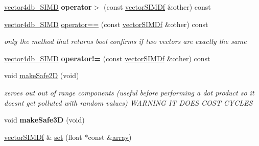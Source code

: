 \begin{DoxyCompactItemize}
\item 
\hyperlink{classirr_1_1core_1_1vectorSIMDBool}{vector4db\+\_\+\+S\+I\+MD} {\bfseries operator$>$} (const \hyperlink{classirr_1_1core_1_1vectorSIMDf}{vector\+S\+I\+M\+Df} \&other) const \hypertarget{classirr_1_1core_1_1vectorSIMDf_a0a0b64421af4b0719b59ccef81ecd781}{}\label{classirr_1_1core_1_1vectorSIMDf_a0a0b64421af4b0719b59ccef81ecd781}

\item 
\hyperlink{classirr_1_1core_1_1vectorSIMDBool}{vector4db\+\_\+\+S\+I\+MD} \hyperlink{classirr_1_1core_1_1vectorSIMDf_ac9fb94dca9de195b0670b045cd8df896}{operator==} (const \hyperlink{classirr_1_1core_1_1vectorSIMDf}{vector\+S\+I\+M\+Df} \&other) const \hypertarget{classirr_1_1core_1_1vectorSIMDf_ac9fb94dca9de195b0670b045cd8df896}{}\label{classirr_1_1core_1_1vectorSIMDf_ac9fb94dca9de195b0670b045cd8df896}

\begin{DoxyCompactList}\small\item\em only the method that returns bool confirms if two vectors are exactly the same \end{DoxyCompactList}\item 
\hyperlink{classirr_1_1core_1_1vectorSIMDBool}{vector4db\+\_\+\+S\+I\+MD} {\bfseries operator!=} (const \hyperlink{classirr_1_1core_1_1vectorSIMDf}{vector\+S\+I\+M\+Df} \&other) const \hypertarget{classirr_1_1core_1_1vectorSIMDf_ab0a9a26c761dc292172803693b3fedb8}{}\label{classirr_1_1core_1_1vectorSIMDf_ab0a9a26c761dc292172803693b3fedb8}

\item 
void \hyperlink{classirr_1_1core_1_1vectorSIMDf_a49f886d7f73c7878c120d09eae9a9366}{make\+Safe2D} (void)\hypertarget{classirr_1_1core_1_1vectorSIMDf_a49f886d7f73c7878c120d09eae9a9366}{}\label{classirr_1_1core_1_1vectorSIMDf_a49f886d7f73c7878c120d09eae9a9366}

\begin{DoxyCompactList}\small\item\em zeroes out out of range components (useful before performing a dot product so it doesnt get polluted with random values) W\+A\+R\+N\+I\+NG IT D\+O\+ES C\+O\+ST C\+Y\+C\+L\+ES \end{DoxyCompactList}\item 
void {\bfseries make\+Safe3D} (void)\hypertarget{classirr_1_1core_1_1vectorSIMDf_ac0bdac77cc253b645a3d26df62ca242c}{}\label{classirr_1_1core_1_1vectorSIMDf_ac0bdac77cc253b645a3d26df62ca242c}

\item 
\hyperlink{classirr_1_1core_1_1vectorSIMDf}{vector\+S\+I\+M\+Df} \& \hyperlink{classirr_1_1core_1_1vectorSIMDf_ab83cb199d2ce42b0baef98f030a6d066}{set} (float $\ast$const \&\hyperlink{classirr_1_1core_1_1array}{array})\hypertarget{classirr_1_1core_1_1vectorSIMDf_ab83cb199d2ce42b0baef98f030a6d066}{}\label{classirr_1_1core_1_1vectorSIMDf_ab83cb199d2ce42b0baef98f030a6d066}


\end{DoxyCompactItemize}
